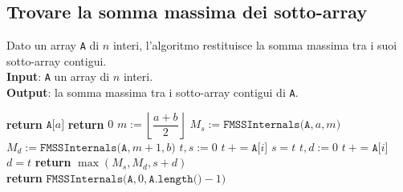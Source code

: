 \documentclass[a4paper, 12pt]{report}
\begin{document}
    \subsection{Trovare la somma massima dei sotto-array}

    \begin{algorithm}[H]
        \caption{
            Dato un array \texttt{A} di $n$ interi, l'algoritmo restituisce la somma massima tra i suoi sotto-array contigui.\\
            \textbf{Input}: \texttt{A} un array di $n$ interi.\\
            \textbf{Output}: la somma massima tra i sotto-array contigui di \texttt{A}.
        }

        \begin{algorithmic}[1]
                        \State \textbf{return} $\texttt{A[}a\texttt{]}$
                    \Else
                        \State \textbf{return} $0$
                    \EndIf
                \Else
                    \State $m := \left \lfloor \dfrac{a + b}{2} \right \rfloor$
                    \State $M_s := \texttt{FMSSInternals(A}, a, m\texttt{)}$
                    \State $M_d := \texttt{FMSSInternals(A}, m +1, b\texttt{)}$
                    \State $t, s := 0$
                     
                        \State $t \ += \texttt{A[}i\texttt{]}$
                            \State $s = t$
                        \EndIf
                    \EndFor
                    \State $t, d := 0$
                     
                        \State $t \ += \texttt{A[}i\texttt{]}$
                            \State $d = t$
                        \EndIf
                    \EndFor
                    \State \textbf{return} $\max(M_s, M_d, s + d)$
                \EndIf
            \EndFunction
            \\
                \State \textbf{return} $\texttt{FMSSInternals(A}, 0, \texttt{A.length()} - 1 \texttt{)}$ 
            \EndFunction
        \end{algorithmic}
    \end{algorithm}
\end{document}
